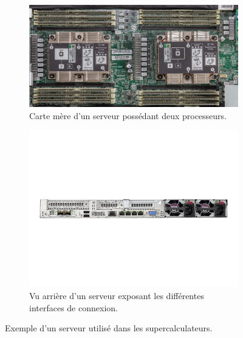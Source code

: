 \begin{enumerate}
                \begin{figure}[t!]
                    \centering
                    \begin{subfigure}[t]{0.48\textwidth}
                        \centering
                        \includegraphics[width=.9\linewidth]{images/motherboard.jpg}
                        \caption{\label{fig:motherboard}Carte mère d'un serveur possédant deux processeurs.}
                    \end{subfigure}\hfill
                \begin{subfigure}[t]{0.48\textwidth}
                        \centering
                        \includegraphics[width=\linewidth]{images/dl360_back.jpg}
                        \caption{Vu arrière d'un serveur exposant les différentes interfaces de connexion.\label{fig:dl360_back}}
                    \end{subfigure}
                    \caption{Exemple d'un serveur utilisé dans les supercalculateurs.}
                    \label{pic_serveur}
                \end{figure}
    

\end{enumerate}
